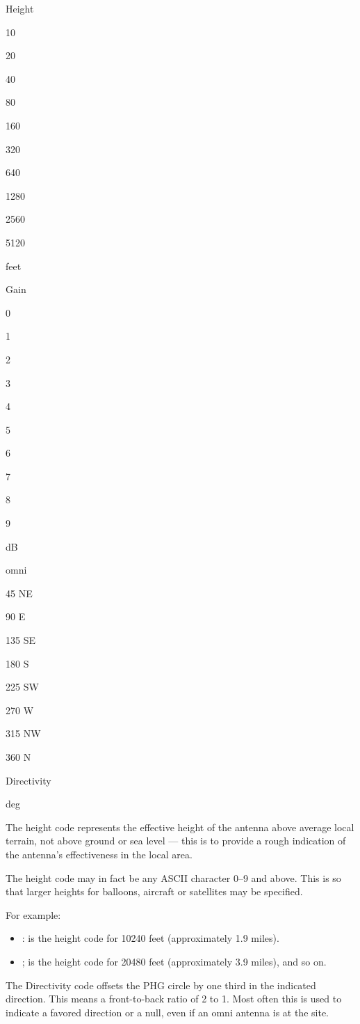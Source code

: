 Height

10

20

40

80

160

320

640

1280

2560

5120

feet

Gain

0

1

2

3

4

5

6

7

8

9

dB

omni

45
NE

90
E

135
SE

180
S

225
SW

270
W

315
NW

360
N

Directivity

deg



The height code represents the effective height of the antenna above average
local terrain, not above ground or sea level — this is to provide a rough
indication of the antenna’s effectiveness in the local area.

The height code may in fact be any ASCII character 0–9 and above. This is
so that larger heights for balloons, aircraft or satellites may be specified.

For example:
\begin{itemize}
  
\item : is the height code for 10240 feet (approximately 1.9 miles).
\item ; is the height code for 20480 feet (approximately 3.9 miles), and so on.
\end{itemize}

The Directivity code offsets the PHG circle by one third in the indicated
direction. This means a front-to-back ratio of 2 to 1. Most often this is used
to indicate a favored direction or a null, even if an omni antenna is at the site.

